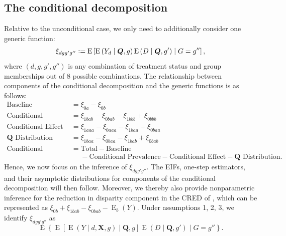 \documentclass[12pt,a4paper]{article}
\newcommand{\E}{\operatorname{E}}
\def\X{{\boldsymbol X}}
\def\Q{{\boldsymbol Q}}
\newcommand{\defeq}{\vcentcolon=}
\begin{document}
\subsection{The conditional decomposition}
Relative to the unconditional case, we only need to additionally consider one generic function:
$$\xi_{dgg'g''} \defeq \E \left[\E \left(Y_d   \mid \Q, g \right) \E \left(D \mid \Q, g' \right) \mid G=g'' \right],$$
where $(d, g, g', g'')$ is any combination of treatment status and group memberships out of 8 possible combinations. The relationship between components of the conditional decomposition and the generic functions is as follows:
\begin{align*}
    \text{Baseline} &= \xi_{0a}-\xi_{0b}  \\
    \text{Conditional Prevalence} &= \xi_{1bab}-\xi_{0bab}-\xi_{1bbb}+\xi_{0bbb} \\
    \text{Conditional Effect} &= \xi_{1aaa}-\xi_{0aaa} - \xi_{1baa}+\xi_{0baa} \\
    \Q \text{ Distribution} &= \xi_{1baa}-\xi_{0baa} - \xi_{1bab}+\xi_{0bab} \\
    \text{Conditional Selection} &= \text{Total} - \text{Baseline} \\
    &\phantom{{}={}} - \text{Conditional Prevalence} - \text{Conditional Effect} - \Q \text{ Distribution}.
\end{align*}
Hence, we now focus on the inference of $\xi_{dgg'g''}$. The EIFs,  one-step estimators, and their asymptotic distributions for components of the conditional decomposition will then follow. Moreover, we thereby also provide nonparametric inference for the reduction in disparity component in the CRED of \citet{jackson_meaningful_2021}, which can be represented as $\xi_{0b}+\xi_{1bab}-\xi_{0bab}-\E_b(Y)$.
Under assumptions 1, 2, 3, we identify $\xi_{dgg'g''}$ as $$\E \left\{\E \left[ \E(Y \mid d,\X,g)   \mid \Q, g \right] \E \left(D \mid \Q, g' \right) \mid G=g'' \right\}.$$
\end{document}
